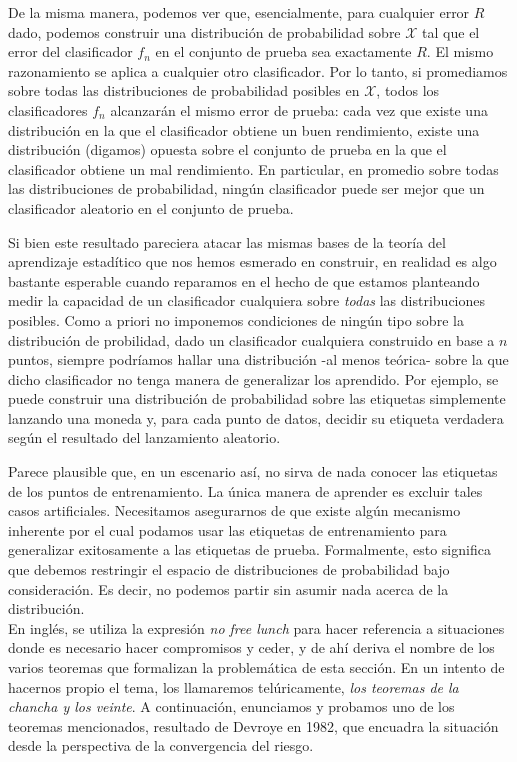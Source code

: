 \documentclass{report}
\begin{document}
De la misma manera, podemos ver que, esencialmente, para cualquier error \(R\) dado, podemos 
construir una distribución de probabilidad sobre \(\mathcal{X}\) tal que el error del clasificador \(f_n\) en el 
conjunto de prueba sea exactamente \(R\). El mismo razonamiento se aplica a cualquier otro 
clasificador. Por lo tanto, si promediamos sobre todas las distribuciones de probabilidad posibles en \(\mathcal{X}\), 
todos los clasificadores \(f_n\) alcanzarán el mismo error de prueba: cada vez que existe una 
distribución en la que el clasificador obtiene un buen rendimiento, existe una distribución 
(digamos) opuesta sobre el conjunto de prueba en la que el clasificador obtiene un mal rendimiento.
En particular, en promedio sobre todas las distribuciones de probabilidad, ningún 
clasificador puede ser mejor que un clasificador aleatorio en el conjunto de prueba.\newline

Si bien este resultado pareciera atacar las mismas bases de la teoría del aprendizaje estadítico que nos hemos esmerado en 
construir, en realidad es algo bastante esperable cuando reparamos en el hecho de que estamos planteando
medir la capacidad de un clasificador cualquiera sobre \textit{todas} las distribuciones posibles. Como a priori
no imponemos condiciones de ningún tipo sobre la distribución de probilidad, dado un clasificador cualquiera construido
en base a $n$ puntos, siempre podríamos hallar una distribución -al menos teórica- sobre la que dicho clasificador no tenga
manera de generalizar los aprendido. Por ejemplo, se puede construir una distribución de probabilidad sobre las etiquetas simplemente 
lanzando una moneda y, para cada punto de datos, decidir su etiqueta verdadera según el resultado del 
lanzamiento aleatorio. \newline

Parece plausible que, en un escenario así, no sirva de nada conocer las etiquetas de los puntos de 
entrenamiento. La única manera de aprender es excluir tales casos artificiales. Necesitamos asegurarnos 
de que existe algún mecanismo inherente por el cual podamos usar las etiquetas de entrenamiento para 
generalizar exitosamente a las etiquetas de prueba. Formalmente, esto significa que debemos restringir 
el espacio de distribuciones de probabilidad bajo consideración. Es decir, no podemos partir sin asumir
nada acerca de la distribución.\\

En inglés, se utiliza la expresión \textit{no free lunch} para hacer referencia
a situaciones donde es necesario hacer compromisos y ceder, y de ahí deriva el nombre de los varios teoremas
que formalizan la problemática de esta sección. En un intento de hacernos propio el tema, los llamaremos 
telúricamente, \textit{los teoremas de la chancha y los veinte}. 
A continuación, enunciamos y probamos uno de los teoremas mencionados, resultado de Devroye en 1982, que encuadra la
situación desde la perspectiva de la convergencia del riesgo.\newline
\end{document}
